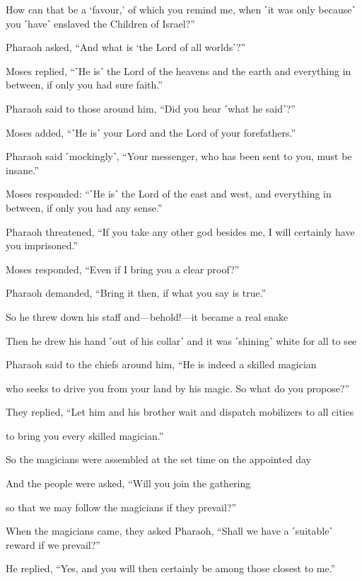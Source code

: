How can that be a ‘favour,’ of which you remind me, when ˹it was only because˺ you ˹have˺ enslaved the Children of Israel?”

Pharaoh asked, “And what is ‘the Lord of all worlds’?”

Moses replied, “˹He is˺ the Lord of the heavens and the earth and everything in between, if only you had sure faith.”

Pharaoh said to those around him, “Did you hear ˹what he said˺?”

Moses added, “˹He is˺ your Lord and the Lord of your forefathers.”

Pharaoh said ˹mockingly˺, “Your messenger, who has been sent to you, must be insane.”

Moses responded: “˹He is˺ the Lord of the east and west, and everything in between, if only you had any sense.”

Pharaoh threatened, “If you take any other god besides me, I will certainly have you imprisoned.”

Moses responded, “Even if I bring you a clear proof?”

Pharaoh demanded, “Bring it then, if what you say is true.”

So he threw down his staff and—behold!—it became a real snake

Then he drew his hand ˹out of his collar˺ and it was ˹shining˺ white for all to see

Pharaoh said to the chiefs around him, “He is indeed a skilled magician

who seeks to drive you from your land by his magic. So what do you propose?”

They replied, “Let him and his brother wait and dispatch mobilizers to all cities

to bring you every skilled magician.”

So the magicians were assembled at the set time on the appointed day

And the people were asked, “Will you join the gathering

so that we may follow the magicians if they prevail?”

When the magicians came, they asked Pharaoh, “Shall we have a ˹suitable˺ reward if we prevail?”

He replied, “Yes, and you will then certainly be among those closest to me.”

